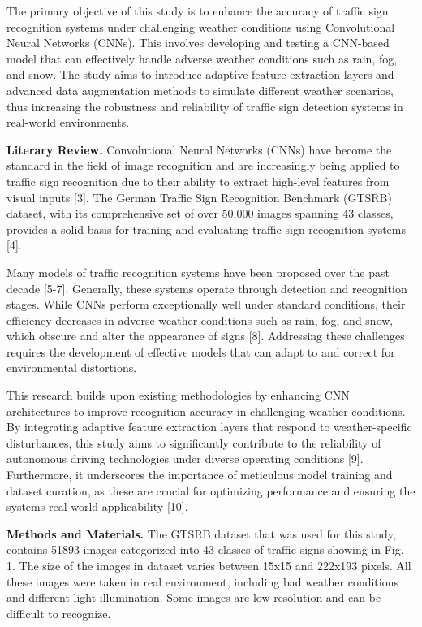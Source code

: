 The primary objective of this study is to enhance the accuracy of
traffic sign recognition systems under challenging weather conditions
using Convolutional Neural Networks (CNNs). This involves developing and
testing a CNN-based model that can effectively handle adverse weather
conditions such as rain, fog, and snow. The study aims to introduce
adaptive feature extraction layers and advanced data augmentation
methods to simulate different weather scenarios, thus increasing the
robustness and reliability of traffic sign detection systems in
real-world environments.

\textbf{Literary Review.} Convolutional Neural Networks (CNNs) have
become the standard in the field of image recognition and are
increasingly being applied to traffic sign recognition due to their
ability to extract high-level features from visual inputs {[}3{]}. The
German Traffic Sign Recognition Benchmark (GTSRB) dataset, with its
comprehensive set of over 50,000 images spanning 43 classes, provides a
solid basis for training and evaluating traffic sign recognition systems
{[}4{]}.

Many models of traffic recognition systems have been proposed over the
past decade {[}5-7{]}. Generally, these systems operate through
detection and recognition stages. While CNNs perform exceptionally well
under standard conditions, their efficiency decreases in adverse weather
conditions such as rain, fog, and snow, which obscure and alter the
appearance of signs {[}8{]}. Addressing these challenges requires the
development of effective models that can adapt to and correct for
environmental distortions.

This research builds upon existing methodologies by enhancing CNN
architectures to improve recognition accuracy in challenging weather
conditions. By integrating adaptive feature extraction layers that
respond to weather-specific disturbances, this study aims to
significantly contribute to the reliability of autonomous driving
technologies under diverse operating conditions {[}9{]}. Furthermore, it
underscores the importance of meticulous model training and dataset
curation, as these are crucial for optimizing performance and ensuring
the system\textquotesingle s real-world applicability {[}10{]}.

\textbf{Methods and Materials.} The GTSRB dataset that was used for this
study, contains 51893 images categorized into 43 classes of traffic
signs showing in Fig. 1. The size of the images in dataset varies
between 15x15 and 222x193 pixels. All these images were taken in real
environment, including bad weather conditions and different light
illumination. Some images are low resolution and can be difficult to
recognize.

